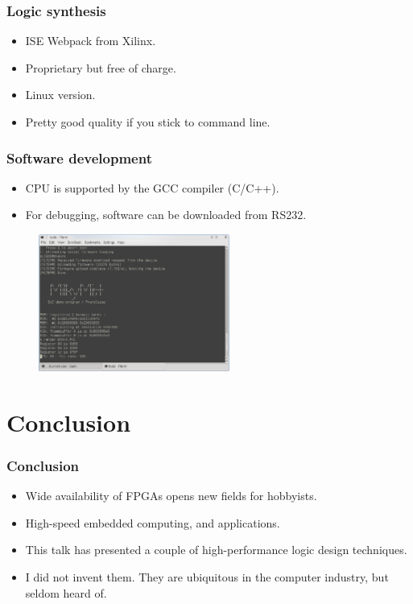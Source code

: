 \documentclass{beamer}
\begin{document}
\frame
{
  \frametitle{Logic synthesis}
  \begin{itemize}
  \item ISE Webpack from Xilinx.
  \item Proprietary but free of charge.
  \item Linux version.
  \item Pretty good quality if you stick to command line.
  \end{itemize}
}

\frame
{
  \frametitle{Software development}
  \begin{itemize}
  \item CPU is supported by the GCC compiler (C/C++).
  \item For debugging, software can be downloaded from RS232.
  \end{itemize}
  \begin{figure}[H]
  \includegraphics[height=45mm]{serialdebug.eps}
  \end{figure}

}


\section{Conclusion}
\frame
{
  \frametitle{Conclusion}
  \begin{itemize}
  \item Wide availability of FPGAs opens new fields for hobbyists.
  \item High-speed embedded computing, and applications.
  \item This talk has presented a couple of high-performance logic design techniques.
  \item I did not invent them. They are ubiquitous in the computer industry, but seldom heard of.
  \end{itemize}
}
\end{document}
